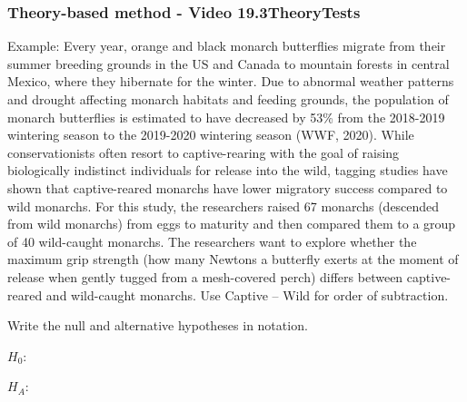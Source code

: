\documentclass[
]{report}
\begin{document}
\subsubsection*{Theory-based method - Video 19.3TheoryTests}\label{theory-based-method---video-19.3theorytests}

Example: Every year, orange and black monarch butterflies migrate from their summer breeding grounds in the US and Canada to mountain forests in central Mexico, where they hibernate for the winter. Due to abnormal weather patterns and drought affecting monarch habitats and feeding grounds, the population of monarch butterflies is estimated to have decreased by 53\% from the 2018-2019 wintering season to the 2019-2020 wintering season (WWF, 2020). While conservationists often resort to captive-rearing with the goal of raising biologically indistinct individuals for release into the wild, tagging studies have shown that captive-reared monarchs have lower migratory success compared to wild monarchs. For this study, the researchers raised 67 monarchs (descended from wild monarchs) from eggs to maturity and then compared them to a group of 40 wild-caught monarchs. The researchers want to explore whether the maximum grip strength (how many Newtons a butterfly exerts at the moment of release when gently tugged from a mesh-covered perch) differs between captive-reared and wild-caught monarchs. Use Captive -- Wild for order of subtraction.

Write the null and alternative hypotheses in notation.

\(H_0:\)

\vspace{0.2in}

\(H_A:\)

\vspace{0.2in}
\end{document}
